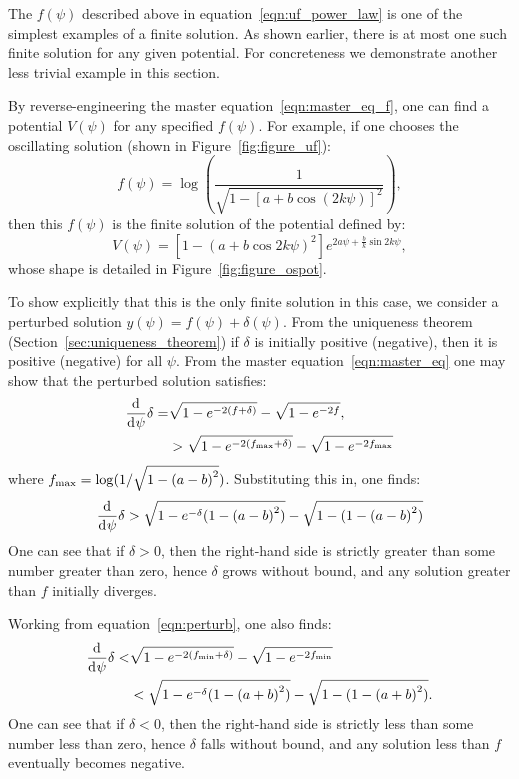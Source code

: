 %
The \(f(\psi)\) described above in equation~\eqref{eqn:uf_power_law} is one of the simplest examples of a finite solution. As shown earlier, there is at most one such finite solution for any given potential. For concreteness we demonstrate another less trivial example in this section.

By reverse-engineering the master equation~\eqref{eqn:master_eq_f}, one can find a potential \(V(\psi)\) for any specified \(f(\psi)\). For example, if one chooses the oscillating solution (shown in Figure~\ref{fig:figure_uf}):
%
\begin{equation}
  f(\psi) = \log\left( \frac{1}{\sqrt{1-{[a+b\cos(2k\psi)]}^2}}\right),
  \label{eqn:uf_example}
\end{equation}
%
then this \(f(\psi)\) is the finite solution of the potential defined by:
%
\begin{equation}
	V(\psi)
    =
    \left[ 1-{(a+b \cos2k\psi)}^2 \right]
    e^{2 a \psi +\frac{b}{k} \sin 2k\psi},
    \label{eqn:Vphi_uf_example}
\end{equation}
whose shape is detailed in Figure~\ref{fig:figure_ospot}.
%

To show explicitly that this is the only finite solution in this case, we consider a perturbed solution \(y(\psi) = f(\psi)+\delta(\psi)\).  From the uniqueness theorem (Section~\ref{sec:uniqueness_theorem}) if \(\delta\) is initially positive (negative), then it is positive (negative) for all \(\psi\). From the master equation~\eqref{eqn:master_eq} one may show that the perturbed solution satisfies:
%
\begin{align}
  \frac{\operatorname{d}^{}\!{}}{\operatorname{d}^{}\!{\psi}}\delta 
  =& 
  \sqrt{1-e^{-2(f+\delta)}} -\sqrt{1-e^{-2f}}, 
  \nonumber
  \\
  &>
  \sqrt{1-e^{-2(f_\mathrm{max}+\delta)}} -\sqrt{1-e^{-2f_\mathrm{max}}}
  \label{eqn:perturb}
\end{align}
%
where \(f_\mathrm{max} = \log(1/\sqrt{1-{(a-b)}^2})\). Substituting this in, one finds:
%
\begin{align}
  \frac{\operatorname{d}^{}\!{}}{\operatorname{d}^{}\!{\psi}}\delta 
  > 
  \sqrt{1-e^{-\delta}({1-{(a-b)}^2})} - \sqrt{1-({1-{(a-b)}^2})}
\end{align}
%
One can see that if \(\delta>0\), then the right-hand side is strictly greater than some number greater than zero, hence \(\delta\) grows without bound, and any solution greater than \(f\) initially diverges. 

Working from equation~\eqref{eqn:perturb}, one also finds:
%
\begin{align}
  \frac{\operatorname{d}^{}\!{}}{\operatorname{d}^{}\!{\psi}}\delta 
  <&
  \sqrt{1-e^{-2(f_\mathrm{min}+\delta)}} -\sqrt{1-e^{-2f_\mathrm{min}}} 
  \nonumber
  \\
  &<
  \sqrt{1-e^{-\delta}({1-{(a+b)}^2})} - \sqrt{1-({1-{(a+b)}^2})}.
\end{align}
%
One can see that if \(\delta<0\), then the right-hand side is strictly less than some number less than zero, hence \(\delta\) falls without bound, and any solution less than \(f\) eventually becomes negative. 

